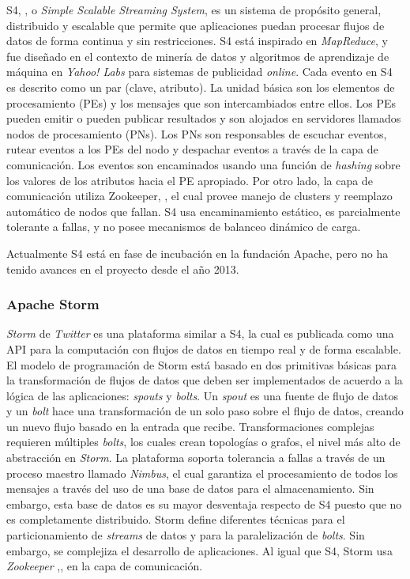 S4, \cite{NeumeyerS4}, o \textit{Simple Scalable Streaming System}, es un sistema de propósito general, distribuido y escalable que permite que aplicaciones puedan procesar flujos de datos de forma continua y sin restricciones. S4 está inspirado en \textit{MapReduce}, y fue diseñado en el contexto de minería de datos y algoritmos de aprendizaje de máquina en \textit{Yahoo! Labs} para sistemas de publicidad \textit{online}. Cada evento en S4 es descrito como un par (clave, atributo). La unidad básica son los elementos de procesamiento (PEs) y los mensajes que son intercambiados entre ellos. Los PEs pueden emitir o pueden publicar resultados y son alojados en servidores llamados nodos de procesamiento (PNs). Los PNs son responsables de escuchar eventos, rutear eventos a los PEs del nodo y despachar eventos a través de la capa de comunicación. Los eventos son encaminados usando una función de \textit{hashing} sobre los valores de los atributos hacia el PE apropiado. Por otro lado, la capa de comunicación utiliza Zookeeper, \cite{HuntZookeeper}, el cual provee manejo de clusters y reemplazo automático de nodos que fallan. S4 usa encaminamiento estático, es parcialmente tolerante a fallas, y no posee mecanismos de balanceo dinámico de carga.
					
Actualmente S4 está en fase de incubación en la fundación Apache, pero no ha tenido avances en el proyecto desde el año 2013.

\subsubsection*{Apache Storm}
\label{arte:SPS:storm}
					
\textit{Storm} de \textit{Twitter} es una plataforma similar a S4, la cual es publicada como una API para la computación con flujos de datos en tiempo real y de forma escalable. El modelo de programación de Storm está basado en dos primitivas básicas para la transformación de flujos de datos que deben ser implementados de acuerdo a la lógica de las aplicaciones: \textit{spouts} y \textit{bolts}. Un \textit{spout} es una fuente de flujo de datos y un \textit{bolt} hace una transformación de un solo paso sobre el flujo de datos, creando un nuevo flujo basado en la entrada que recibe. Transformaciones complejas requieren múltiples \textit{bolts}, los cuales crean topologías o grafos, el nivel más alto de abstracción en \textit{Storm}. La plataforma soporta tolerancia a fallas a través de un proceso maestro llamado \textit{Nimbus}, el cual garantiza el procesamiento de todos los mensajes a través del uso de una base de datos para el almacenamiento. Sin embargo, esta base de datos es su mayor desventaja respecto de S4 puesto que no es completamente distribuido. Storm define diferentes técnicas para el particionamiento de \textit{streams} de datos y para la paralelización de \textit{bolts}. Sin embargo, se complejiza el desarrollo de aplicaciones. Al igual que S4, Storm usa \textit{Zookeeper} ,\cite{HuntZookeeper}, en la capa de comunicación.

